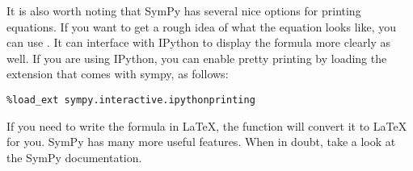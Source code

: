 It is also worth noting that SymPy has several nice options for printing equations.
If you want to get a rough idea of what the equation looks like, you can use .
It can interface with IPython to display the formula more clearly as well.
If you are using IPython, you can enable pretty printing by loading the extension that comes with sympy, as follows:
\begin{lstlisting}
%load_ext sympy.interactive.ipythonprinting
\end{lstlisting}
If you need to write the formula in LaTeX, the function  will convert it to LaTeX for you.
SymPy has many more useful features.
When in doubt, take a look at the SymPy documentation.